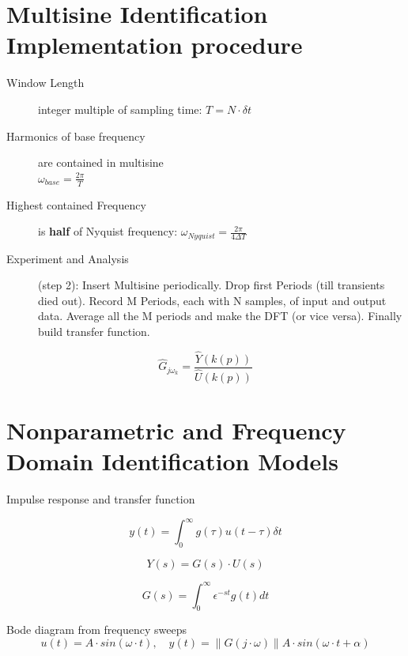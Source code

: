 \section*{Multisine Identification Implementation procedure}
\begin{description}
\item[Window Length] integer multiple of sampling time:  \( T = N \cdot \delta t\)
\item[Harmonics of base frequency] are contained in multisine \\ \( {\omega}_{base} = \frac{2 \pi}{T}\)
\item[Highest contained Frequency] is \textbf{half} of Nyquist frequency: \( {\omega}_{Nyquist}  = \frac{2 \pi}{4 \Delta T}\)

\item[Experiment and Analysis] (step 2): Insert Multisine periodically. Drop first Periods (till transients died out). Record M Periods, each with N samples, of input and output data. Average all the M periods and make the DFT (or vice versa). Finally build transfer function.
\end{description}

\begin{equation*}
{\hat{G} _{j{\omega}_{k}}}=\frac{\hat{Y}(k(p))}{\hat{U}(k(p))}
\end{equation*}





\section*{Nonparametric and Frequency Domain Identification Models}
Impulse response and transfer function

\begin{equation*}
y(t)=\int _{ 0 }^{ \infty  }{ g(\tau)u(t-\tau) \delta t } 
\end{equation*}

\begin{equation*}
Y(s)=G(s)\cdot U(s)
\end{equation*}

\begin{equation*}
G(s)=\int _{ 0 }^{ \infty  }{ \epsilon }^{ -st }g(t)dt
\end{equation*}

Bode diagram from frequency sweeps
\begin{equation*}
u(t)=A\cdot sin(\omega \cdot t),\quad y(t)=\parallel G(j\cdot \omega )\parallel A\cdot sin(\omega \cdot t+\alpha )
\end{equation*}


